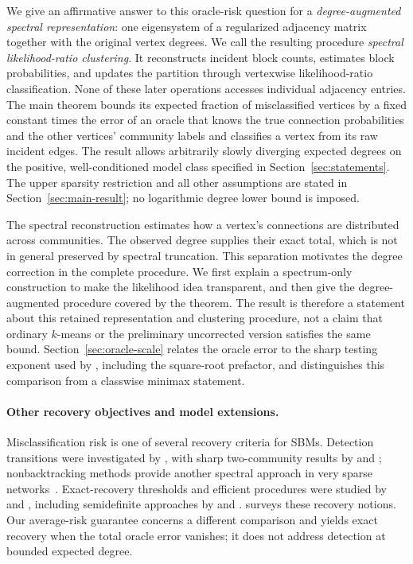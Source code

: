 We give an affirmative answer to this oracle-risk question for a
\emph{degree-augmented spectral representation}: one eigensystem of a
regularized adjacency matrix together with the original vertex degrees.
We call the resulting procedure \emph{spectral likelihood-ratio clustering}.
It reconstructs incident block counts, estimates block probabilities,
and updates the partition through vertexwise likelihood-ratio classification.
None of these later operations accesses individual adjacency entries.
The main theorem bounds its expected fraction of misclassified vertices
by a fixed constant times the error of an oracle that knows the true
connection probabilities and the other vertices' community labels and
classifies a vertex from its raw incident edges. The result allows
arbitrarily slowly diverging expected degrees on the positive,
well-conditioned model class specified in Section~\ref{sec:statements}.
The upper sparsity restriction and all other assumptions are stated in
Section~\ref{sec:main-result}; no logarithmic degree lower bound is
imposed.

The spectral reconstruction estimates how a vertex's connections are
distributed across communities. The observed degree supplies their
exact total, which is not in general preserved by spectral truncation.
This separation motivates the degree correction in the complete
procedure. We first explain a spectrum-only construction to make the
likelihood idea transparent, and then give the degree-augmented
procedure covered by the theorem. The result is therefore a statement
about this retained representation and clustering procedure, not a claim that
ordinary $k$-means or the preliminary uncorrected version satisfies
the same bound. Section~\ref{sec:oracle-scale} relates the oracle
error to the sharp testing exponent used by \citet{zhouli},
including the square-root prefactor, and distinguishes this comparison
from a classwise minimax statement.

\paragraph{Other recovery objectives and model extensions.}
Misclassification risk is one of several recovery criteria for SBMs.
Detection transitions were investigated by \citet{decelle2011}, with sharp two-community results by
\citet{mns2018} and
\citet{massoulie2014}; nonbacktracking methods provide
another spectral approach in very sparse networks~\citep{krzakala2013}.
Exact-recovery thresholds and efficient procedures were studied by
\citet{abh2016} and \citet{abbesandon2015}, including semidefinite approaches by
\citet{hajek2016} and \citet{aminilevina2018}. \citet{abbe2018} surveys these
recovery notions. Our average-risk guarantee concerns a different
comparison and yields exact recovery when the total oracle error
vanishes; it does not address detection at bounded expected degree.

